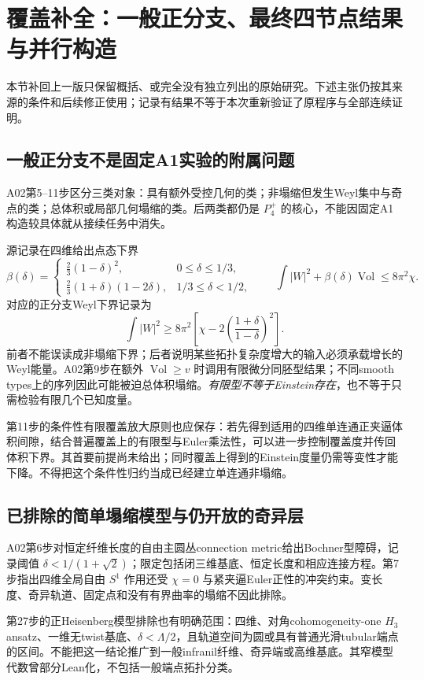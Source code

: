\documentclass[UTF8,a4paper,11pt,fontset=fandol]{ctexart}
\numberwithin{equation}{section}
\theoremstyle{definition}
\newcommand{\Vol}{\operatorname{Vol}}
\begin{document}
\section{覆盖补全：一般正分支、最终四节点结果与并行构造}\label{sec:restore-a02}
本节补回上一版只保留概括、或完全没有独立列出的原始研究。下述主张仍按其来源的条件和后续修正使用；记录有结果不等于本次重新验证了原程序与全部连续证明。

\subsection{一般正分支不是固定A1实验的附属问题}
A02第5--11步区分三类对象：具有额外受控几何的类；非塌缩但发生Weyl集中与奇点的类；总体积或局部几何塌缩的类。后两类都仍是 $P_4^+$ 的核心，不能因固定A1构造较具体就从接续任务中消失。

源记录在四维给出点态下界
\[
\beta(\delta)=\begin{cases}
\frac23(1-\delta)^2,&0\le\delta\le1/3,\\
\frac23(1+\delta)(1-2\delta),&1/3\le\delta<1/2,
\end{cases}
\qquad
\int|W|^2+\beta(\delta)\Vol\le8\pi^2\chi.
\]
对应的正分支Weyl下界记录为
\[
\int|W|^2\ge8\pi^2\left[\chi-2\left(\frac{1+\delta}{1-\delta}\right)^2\right].
\]
前者不能误读成非塌缩下界；后者说明某些拓扑复杂度增大的输入必须承载增长的Weyl能量。A02第9步在额外 $\Vol\ge v$ 时调用有限微分同胚型结果；不同smooth types上的序列因此可能被迫总体积塌缩。\emph{有限型不等于Einstein存在}，也不等于只需检验有限几个已知度量。

第11步的条件性有限覆盖放大原则也应保存：若先得到适用的四维单连通正夹逼体积间隙，结合普遍覆盖上的有限型与Euler乘法性，可以进一步控制覆盖度并传回体积下界。其首要前提尚未给出；同时覆盖上得到的Einstein度量仍需等变性才能下降。不得把这个条件性归约当成已经建立单连通非塌缩。

\subsection{已排除的简单塌缩模型与仍开放的奇异层}
A02第6步对恒定纤维长度的自由主圆丛connection metric给出Bochner型障碍，记录阈值 $\delta<1/(1+\sqrt2)$；限定包括闭三维基底、恒定长度和相应连接方程。第7步指出四维全局自由 $S^1$ 作用还受 $\chi=0$ 与紧夹逼Euler正性的冲突约束。变长度、奇异轨道、固定点和没有有界曲率的塌缩不因此排除。

第27步的正Heisenberg模型排除也有明确范围：四维、对角cohomogeneity-one $H_3$ ansatz、一维无twist基底、$\delta<\Lambda/2$，且轨道空间为圆或具有普通光滑tubular端点的区间。不能把这一结论推广到一般infranil纤维、奇异端或高维基底。其窄模型代数曾部分Lean化，不包括一般端点拓扑分类。
\end{document}
